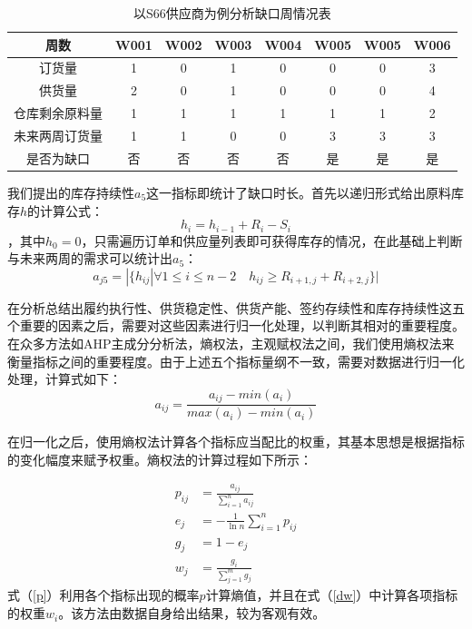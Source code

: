 \documentclass{my_paper}
\begin{document}
\begin{enumerate}
\begin{table}[ht]
    \centering
    \caption{以S66供应商为例分析缺口周情况表}
    \begin{tabular}{c|ccccccc}
    \toprule
    周数      & W001 & W002 & W003 & W004 & W005 & W005 & W006 \\\midrule
订货量     & 1    & 0    & 1    & 0    & 0    & 0    & 3    \\
供货量     & 2    & 0    & 1    & 0    & 0    & 0    & 4    \\
仓库剩余原料量 & 1    & 1    & 1    & 1    & 1    & 1    & 2    \\
未来两周订货量 & 1    & 1    & 0    & 0    & 3    & 3    & 3    \\
是否为缺口   & 否    & 否    & 否    & 否    & 是    & 是    & 是\\
    \bottomrule
      \end{tabular}
    
    \label{label}
      \end{table}
    
    我们提出的库存持续性$a_5$这一指标即统计了缺口时长。首先以递归形式给出原料库存$h$的计算公式：
    \begin{equation}
    h_i=h_{i-1}+R_i-S_i
    \label{hi}
    \end{equation}
    ，其中$h_0=0$，只需遍历订单和供应量列表即可获得库存的情况，在此基础上判断与未来两周的需求可以统计出$a_5$：
    \begin{equation}
    a_{j5} = |\{ h_{ij} |\forall 1\leq i \leq n-2 \quad h_{ij}\geq R_{i+1,j}+R_{i+2,j}\}|
    \label{aj5}
    \end{equation}
    
\end{enumerate}

在分析总结出履约执行性、供货稳定性、供货产能、签约存续性和库存持续性这五个重要的因素之后，需要对这些因素进行归一化处理，以判断其相对的重要程度。在众多方法如AHP主成分分析法\cite{2}，熵权法\cite{3}，主观赋权法之间，我们使用熵权法来衡量指标之间的重要程度。由于上述五个指标量纲不一致，需要对数据进行归一化处理，计算式如下：
\begin{equation}
a_{ij}=\frac{a_{ij}-min(a_i)}{max(a_i)-min(a_i)}
\label{aij}
\end{equation}

在归一化之后，使用熵权法计算各个指标应当配比的权重，其基本思想是根据指标的变化幅度来赋予权重。熵权法的计算过程如下所示：

\begin{align}
    p_{ij} &= \frac{a_{ij}}{\sum\limits^n_{i=1}a_{ij}}\\
    \label{p}
    e_j &= -\frac{1}{\ln n}\sum\limits^n_{i=1}p_{ij}\\
    \label{ej}
    g_j &= 1-e_j\\
    w_j &= \frac{g_i}{\sum\limits^m_{j=1}g_j}
    \label{dw}
    \end{align}
    式（\ref{p}）利用各个指标出现的概率$p$计算熵值，并且在式（\ref{dw}）中计算各项指标的权重$w_{i}$。该方法由数据自身给出结果，较为客观有效。
\end{document}
